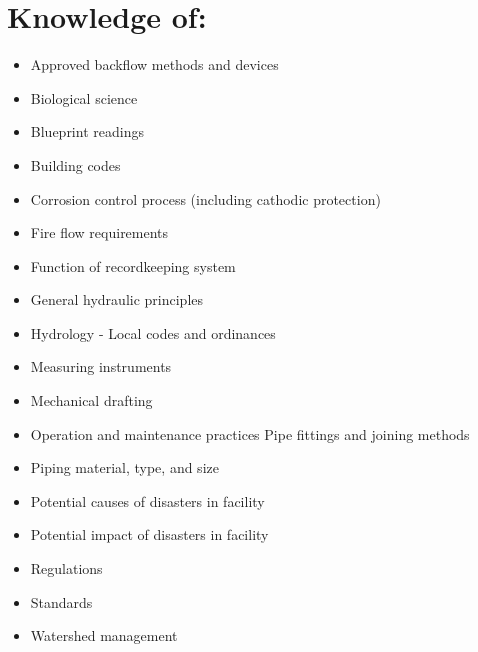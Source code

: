 \documentclass[10pt]{article}
\begin{document}
\section{Knowledge of:}
\begin{itemize}
  \item Approved backflow methods and devices

  \item Biological science

  \item Blueprint readings

  \item Building codes

  \item Corrosion control process (including cathodic protection)

  \item Fire flow requirements

  \item Function of recordkeeping system

  \item General hydraulic principles

  \item Hydrology - Local codes and ordinances

  \item Measuring instruments

  \item Mechanical drafting

  \item Operation and maintenance practices Pipe fittings and joining methods

  \item Piping material, type, and size

  \item Potential causes of disasters in facility

  \item Potential impact of disasters in facility

  \item Regulations

  \item Standards

  \item Watershed management

\end{itemize}
\end{document}
